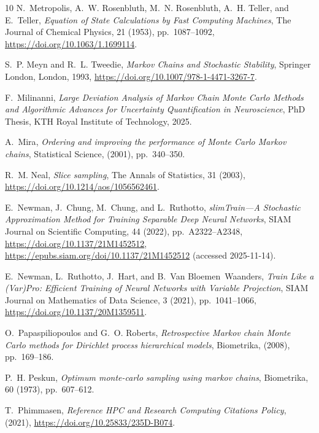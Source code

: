 \documentclass[onefignum,onetabnum]{siamonline250211}
\begin{document}
\begin{thebibliography}{10}
{\sc N.~Metropolis, A.~W. Rosenbluth, M.~N. Rosenbluth, A.~H. Teller, and
  E.~Teller}, {\em Equation of {State} {Calculations} by {Fast} {Computing}
  {Machines}}, The Journal of Chemical Physics, 21 (1953), pp.~1087--1092,
  \url{https://doi.org/10.1063/1.1699114}.

{\sc S.~P. Meyn and R.~L. Tweedie}, {\em Markov {Chains} and {Stochastic}
  {Stability}}, Springer London, London, 1993,
  \url{https://doi.org/10.1007/978-1-4471-3267-7}.

{\sc F.~Milinanni}, {\em Large {Deviation} {Analysis} of {Markov} {Chain}
  {Monte} {Carlo} {Methods} and {Algorithmic} {Advances} for {Uncertainty}
  {Quantification} in {Neuroscience}}, {PhD} {Thesis}, KTH Royal Institute of
  Technology, 2025.

{\sc A.~Mira}, {\em Ordering and improving the performance of {Monte} {Carlo}
  {Markov} chains}, Statistical Science,  (2001), pp.~340--350.

{\sc R.~M. Neal}, {\em Slice sampling}, The Annals of Statistics, 31 (2003),
  \url{https://doi.org/10.1214/aos/1056562461}.

{\sc E.~Newman, J.~Chung, M.~Chung, and L.~Ruthotto}, {\em {slimTrain}---{A}
  {Stochastic} {Approximation} {Method} for {Training} {Separable} {Deep}
  {Neural} {Networks}}, SIAM Journal on Scientific Computing, 44 (2022),
  pp.~A2322--A2348, \url{https://doi.org/10.1137/21M1452512},
  \url{https://epubs.siam.org/doi/10.1137/21M1452512} (accessed 2025-11-14).

{\sc E.~Newman, L.~Ruthotto, J.~Hart, and B.~Van Bloemen~Waanders}, {\em Train
  {Like} a ({Var}){Pro}: {Efficient} {Training} of {Neural} {Networks} with
  {Variable} {Projection}}, SIAM Journal on Mathematics of Data Science, 3
  (2021), pp.~1041--1066, \url{https://doi.org/10.1137/20M1359511}.

{\sc O.~Papaspiliopoulos and G.~O. Roberts}, {\em Retrospective {Markov} chain
  {Monte} {Carlo} methods for {Dirichlet} process hierarchical models},
  Biometrika,  (2008), pp.~169--186.

{\sc P.~H. Peskun}, {\em Optimum monte-carlo sampling using markov chains},
  Biometrika, 60 (1973), pp.~607--612.

{\sc T.~Phimmasen}, {\em Reference {HPC} and {Research} {Computing} {Citations}
  {Policy}},  (2021), \url{https://doi.org/10.25833/235D-B074}.


\end{thebibliography}
\end{document}
